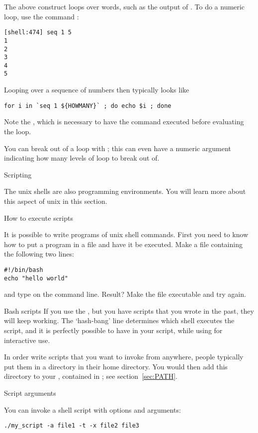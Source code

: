 The above construct loops over words, such as the output of
. To do a numeric loop, use the command :
\begin{lstlisting}
[shell:474] seq 1 5
1
2
3
4
5
\end{lstlisting}
Looping over a sequence of numbers then typically looks like
\begin{lstlisting}
for i in `seq 1 ${HOWMANY}` ; do echo $i ; done
\end{lstlisting}
Note the , which is necessary to have the 
command executed before evaluating the loop.

You can break out of a loop with ;
this can even have a numeric argument indicating
how many levels of loop to break out of.

 {Scripting}
\label{sec:unix-script}

The unix shells are also programming environments. You will learn more
about this aspect of unix in this section.

 {How to execute scripts}
\label{sec:shell-scripting}

It is possible to write programs of unix shell commands. First you
need to know how to put a program in a file and have it be
executed. Make a file  containing the following two lines:
\begin{lstlisting}
#!/bin/bash
echo "hello world"
\end{lstlisting}
and type  on the command line. Result?
Make the file executable and try again.

\begin{zshnote}{Bash scripts}
  If you use the , but you have  scripts
  that you wrote in the past, they will keep working.
  The `hash-bang' line determines which shell executes the script,
  and it is perfectly possible to have  in your script,
  while using  for interactive use.
\end{zshnote}

In order write scripts that you want to invoke from anywhere, people
typically put them in a directory  in their home directory.
You would then add this directory to your ,
contained in ; see section~\ref{sec:PATH}.

 {Script arguments}

You can invoke a shell script with options and arguments:
\begin{lstlisting}
./my_script -a file1 -t -x file2 file3
\end{lstlisting}

